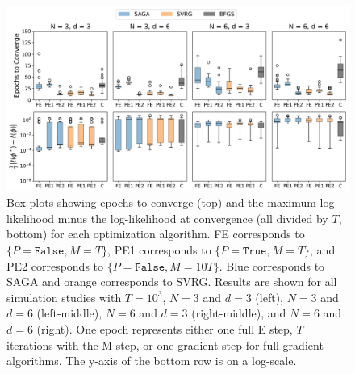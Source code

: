 \documentclass[12pt]{article}
\begin{document}
\begin{figure}[H]
    \centering
    \includegraphics[width=6.5in]{../plt/boxplots_sim_T_1000.png}
    \caption{Box plots showing epochs to converge (top) and the maximum log-likelihood minus the log-likelihood at convergence (all divided by $T$, bottom) for each optimization algorithm. FE corresponds to $\{P = \texttt{False}, M = T\}$, PE1 corresponds to $\{P = \texttt{True}, M = T\}$, and PE2 corresponds to $\{P = \texttt{False}, M = 10T\}$. Blue corresponds to SAGA and orange corresponds to SVRG. Results are shown for all simulation studies with $T=10^{3}$, $N=3$ and $d=3$ (left), $N=3$ and $d=6$ (left-middle), $N=6$ and $d=3$ (right-middle), and $N=6$ and $d=6$ (right). One epoch represents either one full E step, $T$ iterations with the M step, or one gradient step for full-gradient algorithms. The y-axis of the bottom row is on a log-scale.}
    \label{fig:boxplots_sim}
\end{figure}
%
\end{document}
